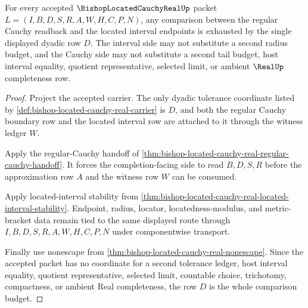 \begin{theorem}
\label{thm:bishop-located-cauchy-real-shared-tolerance-exactness}
For every accepted $\BishopLocatedCauchyRealUp$ packet $L=(I,B,D,S,R,A,W,H,C,P,N)$, any comparison between the regular Cauchy readback and the located interval endpoints is exhausted by the single displayed dyadic row $D$. The interval side may not substitute a second radius budget, and the Cauchy side may not substitute a second tail budget, host interval equality, quotient representative, selected limit, or ambient $\RealUp$ completeness row.
\end{theorem}
\begin{proof}
Project the accepted carrier. The only dyadic tolerance coordinate listed by \autoref{def:bishop-located-cauchy-real-carrier} is $D$, and both the regular Cauchy boundary row and the located interval row are attached to it through the witness ledger $W$.

Apply the regular-Cauchy handoff of \autoref{thm:bishop-located-cauchy-real-regular-cauchy-handoff}. It forces the completion-facing side to read $B,D,S,R$ before the approximation row $A$ and the witness row $W$ can be consumed.

Apply located-interval stability from \autoref{thm:bishop-located-cauchy-real-located-interval-stability}. Endpoint, radius, locator, locatedness-modulus, and metric-bracket data remain tied to the same displayed route through $I,B,D,S,R,A,W,H,C,P,N$ under componentwise transport.

Finally use nonescape from \autoref{thm:bishop-located-cauchy-real-nonescape}. Since the accepted packet has no coordinate for a second tolerance ledger, host interval equality, quotient representative, selected limit, countable choice, trichotomy, compactness, or ambient Real completeness, the row $D$ is the whole comparison budget.
\end{proof}

